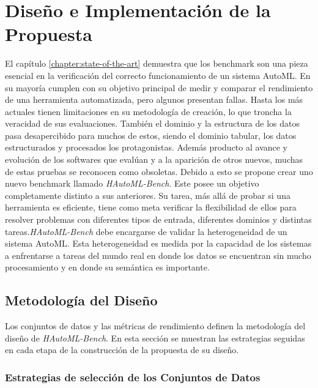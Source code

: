 \chapter{Diseño e Implementación de la Propuesta}\label{chapter:design}



El capítulo \ref{chapter:state-of-the-art} demuestra que los benchmark son una pieza esencial en la verificación del correcto funcionamiento de un sistema AutoML.
En su mayoría cumplen con su objetivo principal de medir y comparar el rendimiento de una herramienta automatizada, pero algunos presentan fallas. Hasta los más actuales 
tienen limitaciones en su metodología de creación, lo que troncha la veracidad de sus evaluaciones. También el dominio y 
la estructura de los datos pasa desapercibido para muchos de estos, siendo el dominio tabular, los datos estructurados y procesados los protagonistas.
Además producto al avance y evolución de los softwares que evalúan y a la aparición de otros nuevos, muchas de estas pruebas se reconocen como obsoletas. 
Debido a esto se propone crear uno nuevo benchmark llamado \textit{HAutoML-Bench}. Este posee un objetivo completamente distinto a sus anteriores. Su tarea, más allá de 
probar si una herramienta es eficiente, tiene como meta verificar la flexibilidad de ellos para resolver problemas con diferentes tipos de entrada, diferentes dominios y 
distintas tareas.\textit{HAutoML-Bench} debe encargarse de validar la heterogeneidad de un sistema AutoML. Esta heterogeneidad es medida por la capacidad de los sistemas a enfrentarse a 
tareas del mundo real en donde los datos se encuentran sin mucho procesamiento y en donde su semántica es importante.


\section{Metodología del Diseño }\label{section:design}

Los conjuntos de datos y las métricas de rendimiento definen la metodología del diseño de \textit{HAutoML-Bench}. En esta sección se muestran las estrategias seguidas 
en cada etapa de la construcción de la propuesta de su diseño. 

\subsection{Estrategias de selección de los Conjuntos de Datos}\label{subsection:selection}

